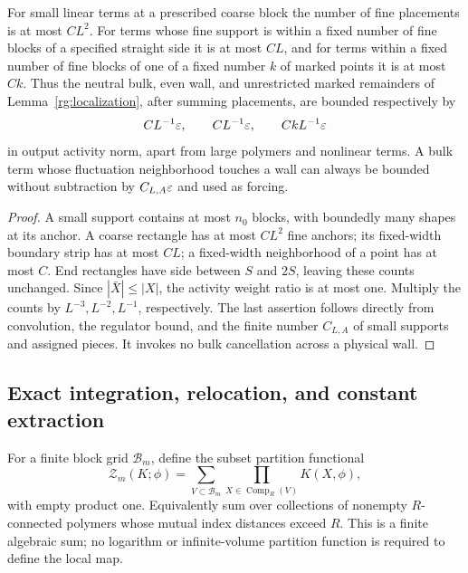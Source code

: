 \begin{corollary}\label{rg:restricted-localization}
For small linear terms at a prescribed coarse block the number of fine placements is at most $CL^2$.  For terms whose fine support is within a fixed number of fine blocks of a specified straight side it is at most $CL$, and for terms within a fixed number of fine blocks of one of a fixed number $k$ of marked points it is at most $Ck$.  Thus the neutral bulk, even wall, and unrestricted marked remainders of Lemma~\ref{rg:localization}, after summing placements, are bounded respectively by
\[
 C L^{-1}\varepsilon,\qquad C L^{-1}\varepsilon,\qquad C kL^{-1}\varepsilon
\]
in output activity norm, apart from large polymers and nonlinear terms.  A bulk term whose fluctuation neighborhood touches a wall can always be bounded without subtraction by $C_{L,A}\varepsilon$ and used as forcing.
\end{corollary}

\begin{proof}
A small support contains at most $n_0$ blocks, with boundedly many shapes at its anchor.  A coarse rectangle has at most $CL^2$ fine anchors; its fixed-width boundary strip has at most $CL$; a fixed-width neighborhood of a point has at most $C$.  End rectangles have side between $S$ and $2S$, leaving these counts unchanged.  Since $|\bar X|\le|X|$, the activity weight ratio is at most one.  Multiply the counts by $L^{-3},L^{-2},L^{-1}$, respectively.  The last assertion follows directly from convolution, the regulator bound, and the finite number $C_{L,A}$ of small supports and assigned pieces.  It invokes no bulk cancellation across a physical wall.
\end{proof}

\subsection{Exact integration, relocation, and constant extraction}

For a finite block grid $\mathcal B_m$, define the subset partition functional
\begin{equation}\label{rg:partition}
 \mathcal Z_m(K;\phi)=\sum_{V\subset\mathcal B_m}
 \prod_{X\in\operatorname{Comp}_R(V)}K(X,\phi),
\end{equation}
with empty product one.  Equivalently sum over collections of nonempty $R$-connected polymers whose mutual index distances exceed $R$.  This is a finite algebraic sum; no logarithm or infinite-volume partition function is required to define the local map.


